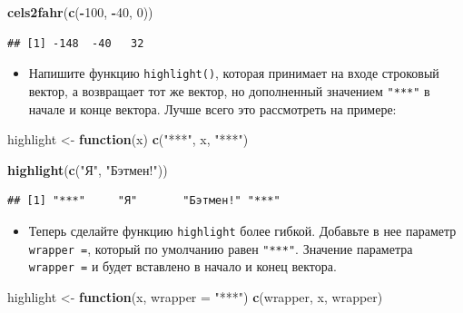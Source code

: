 \documentclass[]{book}
\newenvironment{Shaded}{\begin{snugshade}}{\end{snugshade}}
\newcommand{\KeywordTok}[1]{\textcolor[rgb]{0.13,0.29,0.53}{\textbf{#1}}}
\newcommand{\DataTypeTok}[1]{\textcolor[rgb]{0.13,0.29,0.53}{#1}}
\newcommand{\DecValTok}[1]{\textcolor[rgb]{0.00,0.00,0.81}{#1}}
\newcommand{\StringTok}[1]{\textcolor[rgb]{0.31,0.60,0.02}{#1}}
\newcommand{\ControlFlowTok}[1]{\textcolor[rgb]{0.13,0.29,0.53}{\textbf{#1}}}
\newcommand{\OperatorTok}[1]{\textcolor[rgb]{0.81,0.36,0.00}{\textbf{#1}}}
\newcommand{\NormalTok}[1]{#1}
\providecommand{\tightlist}{%
  \setlength{\itemsep}{0pt}\setlength{\parskip}{0pt}}
\begin{document}
\begin{Shaded}
\begin{Highlighting}[]
\KeywordTok{cels2fahr}\NormalTok{(}\KeywordTok{c}\NormalTok{(}\OperatorTok{-}\DecValTok{100}\NormalTok{, }\OperatorTok{-}\DecValTok{40}\NormalTok{, }\DecValTok{0}\NormalTok{))}
\end{Highlighting}
\end{Shaded}

\begin{verbatim}
## [1] -148  -40   32
\end{verbatim}

\begin{itemize}
\tightlist
\item
  Напишите функцию \texttt{highlight()}, которая принимает на входе
  строковый вектор, а возвращает тот же вектор, но дополненный значением
  \texttt{"***"} в начале и конце вектора. Лучше всего это рассмотреть
  на примере:
\end{itemize}

\begin{Shaded}
\begin{Highlighting}[]
\NormalTok{highlight <-}\StringTok{ }\ControlFlowTok{function}\NormalTok{(x) }\KeywordTok{c}\NormalTok{(}\StringTok{"***"}\NormalTok{, x, }\StringTok{"***"}\NormalTok{)}
\end{Highlighting}
\end{Shaded}

\begin{Shaded}
\begin{Highlighting}[]
\KeywordTok{highlight}\NormalTok{(}\KeywordTok{c}\NormalTok{(}\StringTok{"Я"}\NormalTok{, }\StringTok{"Бэтмен!"}\NormalTok{))}
\end{Highlighting}
\end{Shaded}

\begin{verbatim}
## [1] "***"     "Я"       "Бэтмен!" "***"
\end{verbatim}

\begin{itemize}
\tightlist
\item
  Теперь сделайте функцию \texttt{highlight} более гибкой. Добавьте в
  нее параметр \texttt{wrapper\ =}, который по умолчанию равен
  \texttt{"***"}. Значение параметра \texttt{wrapper\ =} и будет
  вставлено в начало и конец вектора.
\end{itemize}

\begin{Shaded}
\begin{Highlighting}[]
\NormalTok{highlight <-}\StringTok{ }\ControlFlowTok{function}\NormalTok{(x, }\DataTypeTok{wrapper =} \StringTok{"***"}\NormalTok{) }\KeywordTok{c}\NormalTok{(wrapper, x, wrapper)}
\end{Highlighting}
\end{Shaded}
\end{document}
